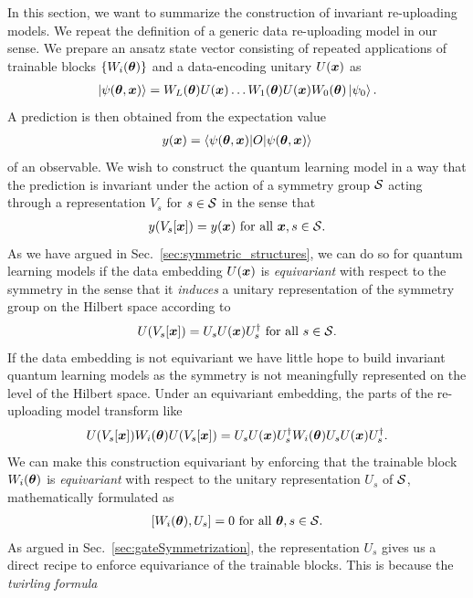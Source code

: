 \documentclass[a4paper,twocolumn,notitlepage,nofootinbib,superscriptaddress,floatfix]{revtex4-2}
\begin{document}
In this section, we want to summarize the construction of invariant re-uploading models. We repeat the definition of a generic data re-uploading model in our sense. We prepare an ansatz state vector consisting of repeated applications of trainable blocks $\{ W_i(\boldsymbol{\theta}) \}$ and a data-encoding unitary $U(\boldsymbol{x})$
as
\begin{align}
    \ket{\psi(\boldsymbol{\theta}, \boldsymbol{x})} =  W_L(\boldsymbol{\theta}) U(\boldsymbol{x}) \dots W_1(\boldsymbol{\theta}) U(\boldsymbol{x}) W_0(\boldsymbol{\theta}) \ket{\psi_0}.
\end{align}
A prediction is then obtained from the expectation value 
\begin{align}
    y(\boldsymbol{x}) = \langle \psi(\boldsymbol{\theta}, \boldsymbol{x}) | O | \psi(\boldsymbol{\theta}, \boldsymbol{x}) \rangle
\end{align}
of an observable. We wish to construct the quantum learning model in a way that the prediction is invariant under the action of a symmetry group $\mathcal{S}$ acting through a representation $V_s$ for $s \in \mathcal{S}$ in the sense that
\begin{align}
    y(V_s[\boldsymbol{x}]) = y(\boldsymbol{x}) \text{ for all } \boldsymbol{x}, s \in \mathcal{S}.
\end{align}
As we have argued in Sec.~\ref{sec:symmetric_structures}, we can do so for quantum learning models if the data embedding $U(\boldsymbol{x})$ is \emph{equivariant} with respect to the symmetry in the sense that it \emph{induces} a unitary representation of the symmetry group on the Hilbert space according to
\begin{align}
    U(V_s[\boldsymbol{x}]) = U_s U(\boldsymbol{x}) U_s^{\dagger} \text{ for all } s\in \mathcal{S}.
\end{align}
If the data embedding is not equivariant we have little hope to build invariant quantum learning models as the symmetry is not meaningfully represented on the level of the Hilbert space. Under an equivariant embedding, the parts of the re-uploading model transform like
\begin{align}
     U(V_s[\boldsymbol{x}]) W_i(\boldsymbol{\theta}) U(V_s[\boldsymbol{x}])  =  U_s U(\boldsymbol{x}) U_s^{\dagger} W_i(\boldsymbol{\theta}) U_s U(\boldsymbol{x}) U_s^{\dagger}.  
\end{align}
We can make this construction equivariant by enforcing that the trainable block $W_i(\boldsymbol{\theta})$ is \emph{equivariant} with respect to the unitary representation $U_s$ of $\mathcal{S}$, mathematically formulated as 
\begin{align}\label{eqn:equivariance_trainable_block}
    [W_i(\boldsymbol{\theta}), U_s] = 0 \text{ for all } \boldsymbol{\theta}, s\in \mathcal{S}.
\end{align}
As argued in Sec.~\ref{sec:gateSymmetrization}, the representation $U_s$ gives us a direct recipe to enforce equivariance of the trainable blocks. This is because the \emph{twirling formula} 
\end{document}
